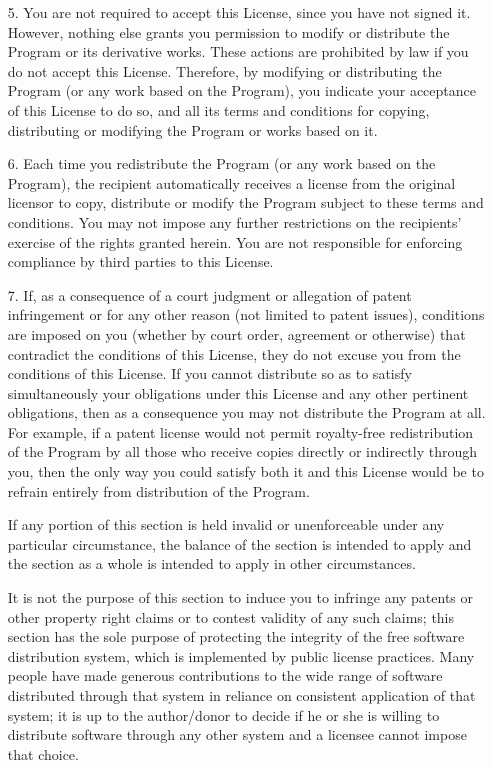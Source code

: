 {\begin{itemize}
\item[5.] You are not required to accept this License, since you have not
  signed it.  However, nothing else grants you permission to modify or
  distribute the Program or its derivative works.  These actions are
  prohibited by law if you do not accept this License.  Therefore, by
  modifying or distributing the Program (or any work based on the
  Program), you indicate your acceptance of this License to do so, and
  all its terms and conditions for copying, distributing or modifying
  the Program or works based on it.

\item[6.] Each time you redistribute the Program (or any work based on the
  Program), the recipient automatically receives a license from the
  original licensor to copy, distribute or modify the Program subject
  to these terms and conditions.  You may not impose any further
  restrictions on the recipients' exercise of the rights granted
  herein.  You are not responsible for enforcing compliance by third
  parties to this License.

\item[7.] If, as a consequence of a court judgment or allegation of patent
  infringement or for any other reason (not limited to patent issues),
  conditions are imposed on you (whether by court order, agreement or
  otherwise) that contradict the conditions of this License, they do
  not excuse you from the conditions of this License.  If you cannot
  distribute so as to satisfy simultaneously your obligations under
  this License and any other pertinent obligations, then as a
  consequence you may not distribute the Program at all.  For example,
  if a patent license would not permit royalty-free redistribution of
  the Program by all those who receive copies directly or indirectly
  through you, then the only way you could satisfy both it and this
  License would be to refrain entirely from distribution of the
  Program.
  
  If any portion of this section is held invalid or unenforceable
  under any particular circumstance, the balance of the section is
  intended to apply and the section as a whole is intended to apply in
  other circumstances.
  
  It is not the purpose of this section to induce you to infringe any
  patents or other property right claims or to contest validity of any
  such claims; this section has the sole purpose of protecting the
  integrity of the free software distribution system, which is
  implemented by public license practices.  Many people have made
  generous contributions to the wide range of software distributed
  through that system in reliance on consistent application of that
  system; it is up to the author/donor to decide if he or she is
  willing to distribute software through any other system and a
  licensee cannot impose that choice.
  

\end{itemize}}
